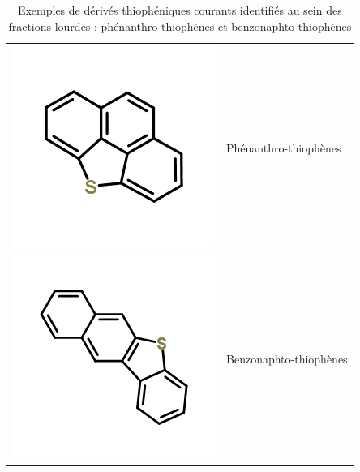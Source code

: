 \begin{table}[h!]
	\begin{center}
		\begin{tabular}{rl}
			\hline
			\includegraphics[scale=0.4]{image/phenanthro-thiophene} & Phénanthro-thiophènes \\
			\includegraphics[scale=0.4]{image/benzo-naphto-thiophene} & Benzonaphto-thiophènes \\
			\hline 
		\end{tabular}
	\end{center}
	\caption{Exemples de dérivés thiophéniques courants identifiés au sein des fractions lourdes : phénanthro-thiophènes et benzonaphto-thiophènes}
	\label{tab:soufre-ex}
\end{table}


